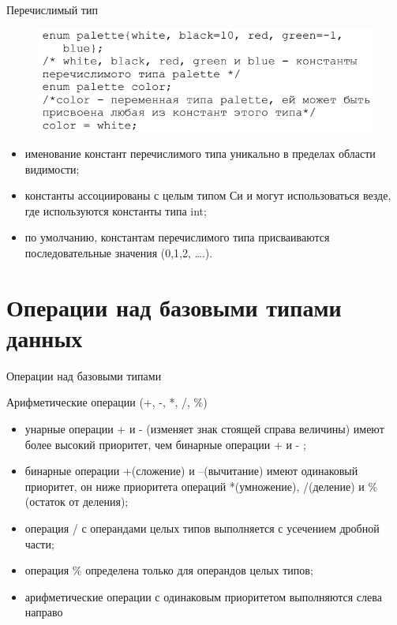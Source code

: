\documentclass{beamer}
\begin{document}
\begin{frame}{Перечислимый тип}
\begin{figure}[h]
\centering
\includegraphics[scale=0.6]{images/lec02-pic03.png}
\end{figure}
\begin{itemize}
\item именование констант перечислимого типа уникально в пределах области видимости;
\item константы ассоциированы с целым типом Си и могут использоваться везде, где используются константы типа int;
\item по умолчанию, константам перечислимого типа присваиваются последовательные значения (0,1,2, ….).
\end{itemize}
\end{frame}

\section{Операции над базовыми типами данных}
\begin{frame}{Операции над базовыми типами}
\begin{block}{Арифметические операции (+, -, *, /, \%)}
\begin{itemize}
\item унарные операции + и - (изменяет знак стоящей справа величины) имеют более высокий приоритет, чем бинарные операции + и - ;
\item бинарные операции +(сложение) и –(вычитание) имеют одинаковый приоритет, он ниже приоритета операций
*(умножение), /(деление) и \%(остаток от деления);
\item операция / с операндами целых типов выполняется с усечением дробной части;
\item операция \% определена только для операндов целых типов;
\item арифметические операции с одинаковым приоритетом выполняются слева направо
\end{itemize}
\end{block}
\end{frame}
\end{document}
